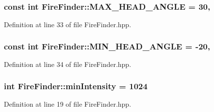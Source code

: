 \hypertarget{classFireFinder_ace5a0c6c6435a4d36377dc94a5f785db}{
\subsubsection[{M\-A\-X\-\_\-\-H\-E\-A\-D\-\_\-\-A\-N\-G\-L\-E}]{\setlength{\rightskip}{0pt plus 5cm}const int Fire\-Finder\-::\-M\-A\-X\-\_\-\-H\-E\-A\-D\-\_\-\-A\-N\-G\-L\-E = 30\hspace{0.3cm}{\ttfamily [static]}, {\ttfamily [private]}}}\label{classFireFinder_ace5a0c6c6435a4d36377dc94a5f785db}


Definition at line 33 of file Fire\-Finder.\-hpp.

\hypertarget{classFireFinder_ac6743699fd08f97088855dc1e87f8dea}{
\subsubsection[{M\-I\-N\-\_\-\-H\-E\-A\-D\-\_\-\-A\-N\-G\-L\-E}]{\setlength{\rightskip}{0pt plus 5cm}const int Fire\-Finder\-::\-M\-I\-N\-\_\-\-H\-E\-A\-D\-\_\-\-A\-N\-G\-L\-E = -\/20\hspace{0.3cm}{\ttfamily [static]}, {\ttfamily [private]}}}\label{classFireFinder_ac6743699fd08f97088855dc1e87f8dea}


Definition at line 34 of file Fire\-Finder.\-hpp.

\hypertarget{classFireFinder_a7d3912a911843b60de3468588cfe8579}{
\subsubsection[{min\-Intensity}]{\setlength{\rightskip}{0pt plus 5cm}int Fire\-Finder\-::min\-Intensity = 1024\hspace{0.3cm}{\ttfamily [private]}}}\label{classFireFinder_a7d3912a911843b60de3468588cfe8579}


Definition at line 19 of file Fire\-Finder.\-hpp.

